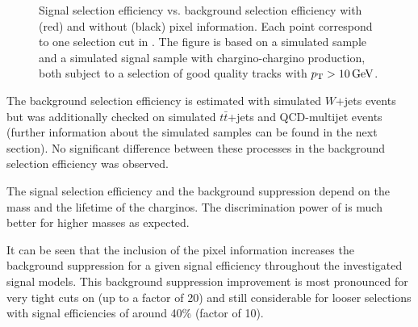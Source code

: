 \begin{figure}[!b]
\begin{tabular}{c}
  \end{tabular}
  \caption{Signal selection efficiency vs. background selection efficiency with (red) and without (black) pixel information.
           Each point correspond to one selection cut in \ias.
           The figure is based on a simulated \WJets sample and a simulated signal sample with chargino-chargino production, both subject to a selection of good quality tracks with $p_{\text{T}}>10\,\text{Ge}\kern-0.06667em\text{V}$.
       }
  \label{fig:ROCplots}
\end{figure} 
The background selection efficiency is estimated with simulated $W$+jets  events but was additionally checked on simulated $t\bar{t}$+jets  and QCD-multijet events 
(further information about the simulated samples can be found in the next section).
No significant difference between these processes in the background selection efficiency was observed.

The signal selection efficiency and the background suppression depend on the mass and the lifetime of the charginos.
The discrimination power of \ias is much better for higher masses as expected.

It can be seen that the inclusion of the pixel information increases the background suppression for a given signal efficiency throughout the investigated signal models.
This background suppression improvement is most pronounced for very tight cuts on \ias (up to a factor of 20) and still considerable for looser selections with signal efficiencies of around 40\% (factor of 10).


